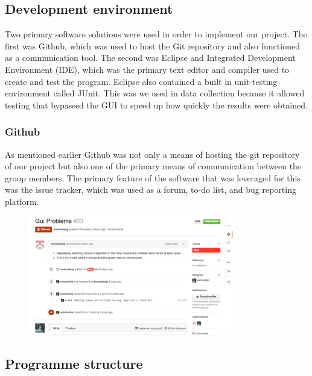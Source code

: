 \documentclass[bibliography=totocnumbered, 10pt]{article}
\theoremstyle{NoticeStyle}
\begin{document}
\subsection{Development environment}
Two primary software solutions were used in order to implement our project.  The first was Github, which was used to host the Git repository and also functioned as a communication tool. The second was Eclipse and Integrated Development Environment (IDE), which was the primary text editor and compiler used to create and test the program. Eclipse also contained a built in unit-testing environment called JUnit. This was we used in data collection because it allowed testing that bypassed the GUI to speed up how quickly the results were obtained.

\subsubsection{Github}
As mentioned earlier Github was not only a means of hosting the git repository of our project but also one of the primary means of communication between the group members. The primary feature of the software that was leveraged for this was the issue tracker, which was used as a forum, to-do list, and bug reporting platform. 

\begin{figure}[H]
\centering
\includegraphics[width=0.8\textwidth]{img/issue_example.pdf}
\caption{}
\end{figure}

\subsection{Programme structure}

%
\end{document}
